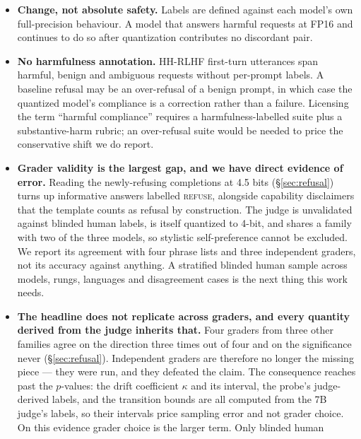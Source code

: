 \documentclass[11pt,a4paper]{article}
\begin{document}
\begin{itemize}[leftmargin=1.4em]
  \item \textbf{Change, not absolute safety.} Labels are defined against each
        model's own full-precision behaviour. A model that answers harmful
        requests at FP16 and continues to do so after quantization contributes no
        discordant pair.
  \item \textbf{No harmfulness annotation.} HH-RLHF first-turn utterances span
        harmful, benign and ambiguous requests without per-prompt labels. A
        baseline refusal may be an over-refusal of a benign prompt, in which case
        the quantized model's compliance is a correction rather than a failure.
        Licensing the term ``harmful compliance'' requires a harmfulness-labelled
        suite \citep{mazeika2024harmbench,souly2024strongreject} plus a
        substantive-harm rubric; an over-refusal suite would be needed to price
        the conservative shift we do report.
  \item \textbf{Grader validity is the largest gap, and we have direct evidence
        of error.} Reading the newly-refusing completions at 4.5 bits
        (\S\ref{sec:refusal}) turns up informative answers labelled
        \textsc{refuse}, alongside capability disclaimers that the template
        counts as refusal by construction. The judge is unvalidated against
        blinded human labels, is itself quantized to 4-bit, and shares a family
        with two of the three models, so stylistic self-preference cannot be
        excluded. We report its agreement with four phrase lists and three
        independent graders, not its accuracy against anything. A stratified
        blinded human sample across models, rungs,
        languages and disagreement cases is the next thing this work needs.
  \item \textbf{The headline does not replicate across graders, and every
        quantity derived from the judge inherits that.} Four graders from three
        other families agree on the direction three times out of four and on the
        significance never (\S\ref{sec:refusal}). Independent graders are
        therefore no longer the missing piece --- they were run, and they
        defeated the claim. The consequence reaches past the $p$-values: the
        drift coefficient $\kappa$ and its interval, the probe's judge-derived
        labels, and the transition bounds are all computed from the 7B judge's
        labels, so their intervals price sampling error and not grader choice.
        On this evidence grader choice is the larger term. Only blinded human

\end{itemize}
\end{document}
